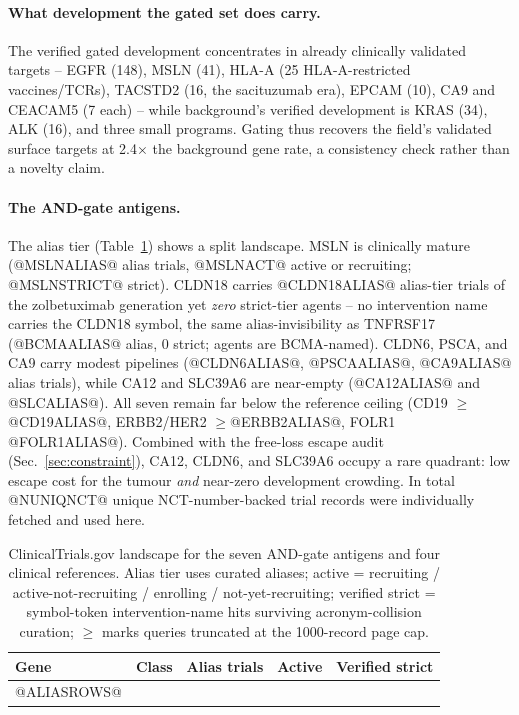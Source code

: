 \paragraph{What development the gated set does carry.} The verified gated
development concentrates in already clinically validated targets -- EGFR (148),
MSLN (41), HLA-A (25 HLA-A-restricted vaccines/TCRs), TACSTD2 (16, the
sacituzumab era), EPCAM (10), CA9 and CEACAM5 (7 each) -- while background's
verified development is KRAS (34), ALK (16), and three small programs. Gating
thus recovers the field's validated surface targets at 2.4$\times$ the
background gene rate, a consistency check rather than a novelty claim.

\paragraph{The AND-gate antigens.} The alias tier (Table~\ref{tab:clintrials})
shows a split landscape. MSLN is clinically mature (@MSLNALIAS@ alias trials,
@MSLNACT@ active or recruiting; @MSLNSTRICT@ strict). CLDN18 carries
@CLDN18ALIAS@ alias-tier trials of the zolbetuximab generation yet \emph{zero}
strict-tier agents -- no intervention name carries the CLDN18 symbol, the same
alias-invisibility as TNFRSF17 (@BCMAALIAS@ alias, 0 strict; agents are
BCMA-named). CLDN6, PSCA, and CA9 carry modest pipelines (@CLDN6ALIAS@,
@PSCAALIAS@, @CA9ALIAS@ alias trials), while CA12 and SLC39A6 are near-empty
(@CA12ALIAS@ and @SLCALIAS@). All seven remain far below the reference ceiling
(CD19 $\geq$@CD19ALIAS@, ERBB2/HER2 $\geq$@ERBB2ALIAS@, FOLR1 @FOLR1ALIAS@).
Combined with the free-loss escape audit (Sec.~\ref{sec:constraint}), CA12,
CLDN6, and SLC39A6 occupy a rare quadrant: low escape cost for the tumour
\emph{and} near-zero development crowding. In total @NUNIQNCT@ unique
NCT-number-backed trial records were individually fetched and used here.

\begin{table}[t]
\centering\small
\caption{ClinicalTrials.gov landscape for the seven AND-gate antigens and four
clinical references. Alias tier uses curated aliases; active = recruiting /
active-not-recruiting / enrolling / not-yet-recruiting; verified strict =
symbol-token intervention-name hits surviving acronym-collision curation;
$\geq$ marks queries truncated at the 1000-record page cap.}
\label{tab:clintrials}
\begin{tabular}{llrrr}
\hline
Gene & Class & Alias trials & Active & Verified strict \\
\hline
@ALIASROWS@
\hline
\end{tabular}
\end{table}

